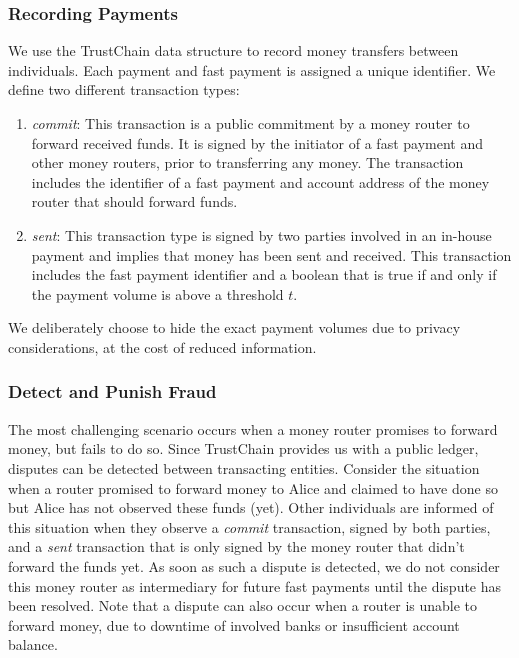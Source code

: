 \subsubsection*{Recording Payments}
We use the TrustChain data structure to record money transfers between individuals.
Each payment and fast payment is assigned a unique identifier.
We define two different transaction types:
\begin{enumerate}
	\item \emph{commit}: This transaction is a public commitment by a money router to forward received funds.
	It is signed by the initiator of a fast payment and other money routers, prior to transferring any money. The transaction includes the identifier of a fast payment and account address of the money router that should forward funds.
	\item \emph{sent}: This transaction type is signed by two parties involved in an in-house payment and implies that money has been sent and received. This transaction includes the fast payment identifier and a boolean that is true if and only if the payment volume is above a threshold $ t $. 
\end{enumerate}
We deliberately choose to hide the exact payment volumes due to privacy considerations, at the cost of reduced information.

\subsubsection*{Detect and Punish Fraud}
The most challenging scenario occurs when a money router promises to forward money, but fails to do so.
Since TrustChain provides us with a public ledger, disputes can be detected between transacting entities.
Consider the situation when a router promised to forward money to Alice and claimed to have done so but Alice has not observed these funds (yet).
Other individuals are informed of this situation when they observe a \emph{commit} transaction, signed by both parties, and a \emph{sent} transaction that is only signed by the money router that didn't forward the funds yet.
As soon as such a dispute is detected, we do not consider this money router as intermediary for future fast payments until the dispute has been resolved.
Note that a dispute can also occur when a router is unable to forward money, due to downtime of involved banks or insufficient account balance.

